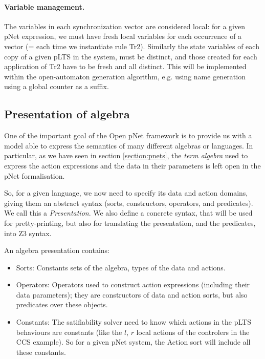 \documentclass{lncs/llncs}
\begin{document}
    


\paragraph{Variable management.}
The variables in each synchronization vector are considered local:
for a given pNet expression, we must have fresh local variables for
each occurrence of a vector (= each time we instantiate rule
Tr2). Similarly the state variables of each copy of a
given pLTS in the system, must be distinct, and those created for each
application of Tr2 have to be fresh and all distinct. 
This will be implemented within the open-automaton generation algorithm,
e.g. using name generation using a global counter as a suffix.


\subsection{Presentation of algebra}
One of the important goal of the Open pNet framework is to provide us
with a model able to express the semantics of many different algebras
or languages. In particular, as we have seen in section
\ref{section:pnets}, the \emph{term algebra} used to express the
action expressions and the data in their parameters is left open in
the pNet formalisation.

So, for a given language, we now need to specify its data and action
domains, giving them an abstract syntax (sorts, constructors, operators,
and predicates). We call this a \emph{Presentation}.
We also define a concrete syntax, that will be used for
pretty-printing, but also for translating the presentation, and the
predicates, into Z3 syntax. 

An algebra presentation contains:
\begin{itemize}
	\item Sorts: Constants sets of the algebra, types of the data
          and actions. 
	\item Operators: Operators used to construct action
          expressions (including their data parameters); they are
          constructors of data and action sorts, but also predicates
          over these objects.
        \item Constants: The satifiability solver need to know which
          actions in the pLTS behaviours are constants (like the $l$,
          $r$ local actions of the controlers in the CCS example). So
          for a given pNet system, the Action sort will include all
          these constants.
\end{itemize}
\end{document}

